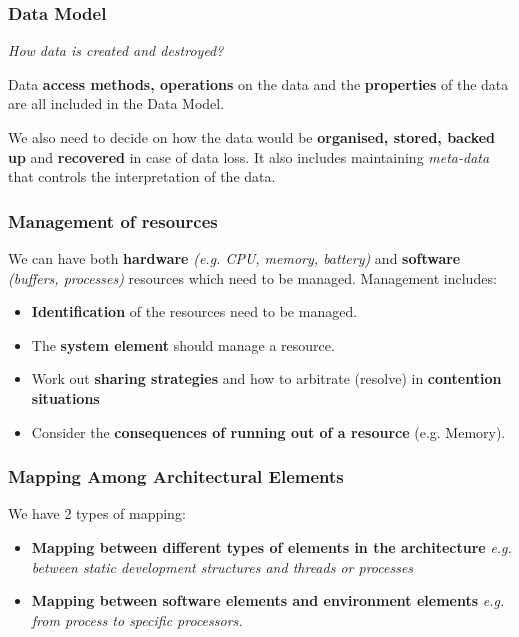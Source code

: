 \documentclass[a4paper]{article}
\begin{document}
\subsubsection{Data Model}

\textit{How data is created and destroyed?}

Data \textbf{access methods, operations} on the data and the \textbf{properties} of the data are all included in the Data Model. 

We also need to decide on how the data would be \textbf{organised, stored, backed up} and \textbf{recovered} in case of data loss. It also includes maintaining \textit{meta-data} that controls the interpretation of the data.


\subsubsection{Management of resources}
We can have both \textbf{hardware} \textit{(e.g. CPU, memory, battery)} and \textbf{software} \textit{(buffers, processes)} resources which need to be managed. Management includes:
\begin{itemize}
\item \textbf{Identification} of the resources need to be managed.
\item The \textbf{system element} should manage a resource.
\item Work out \textbf{sharing strategies} and how to arbitrate (resolve) in \textbf{contention situations}
\item Consider the \textbf{consequences of running out of a resource} (e.g. Memory).
\end{itemize}

\subsubsection{Mapping Among Architectural Elements}
We have 2 types of mapping:
\begin{itemize}
\item \textbf{Mapping between different types of elements in the architecture} 
\textit{e.g. between static development structures and threads or processes}
\item \textbf{Mapping between software elements and environment elements} 
\textit{e.g. from process to specific processors.}\\\\
\end{itemize}
\end{document}
